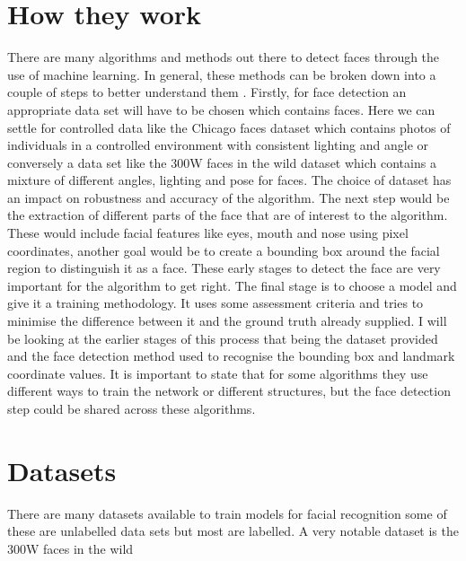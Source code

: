 \documentclass{article}
\begin{document}
\section{How they work}
There are many algorithms and methods out there to detect faces through the use of machine
learning. In general, these methods can be broken down into a couple of steps to better
understand them . Firstly, for face detection an appropriate data set will have to be chosen
which contains faces. Here we can settle for controlled data like the Chicago faces dataset \cite{Ma2015} which contains photos of individuals in a controlled
environment with consistent lighting and angle or conversely a data set like the 300W faces in
the wild \cite{Sagonas2013} dataset which contains a mixture of different angles, lighting
and pose for faces. The choice of dataset has an impact on robustness and accuracy of the
algorithm. The next step would be the extraction of different parts of the face that are of
interest to the algorithm. These would include facial features like eyes, mouth and nose using
pixel coordinates, another goal would be to create a bounding box around the facial region to
distinguish it as a face. These early stages to detect the face are very important for the
algorithm to get right. The final stage is to choose a model and give it a training methodology.
It uses some assessment criteria and tries to minimise the difference between it and the ground
truth already supplied.
I will be looking at the earlier stages of this process that being the dataset provided and the
face detection method used to recognise the bounding box and landmark coordinate values.
It is important to state that for some algorithms they use different ways to train the network
or different structures, but the face detection step could be shared across these algorithms.

\section{Datasets}
There are many datasets available to train models for facial recognition some of these are
unlabelled data sets but most are labelled. A very notable dataset is the 300W faces in the wild
\end{document}
